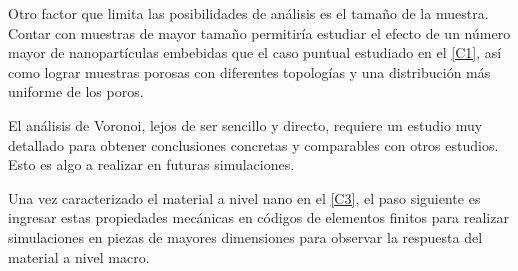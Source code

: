 Otro factor que limita las posibilidades de análisis es el tamaño de la muestra. Contar con muestras de mayor tamaño permitiría estudiar el efecto de un  número mayor de nanopartículas embebidas que el caso puntual estudiado en el \cref{C1}, así como lograr muestras porosas con diferentes topologías y una distribución más uniforme de los poros.

El análisis de Voronoi, lejos de ser sencillo y directo, requiere un estudio muy detallado para obtener conclusiones concretas y comparables con otros estudios. Esto es algo a realizar en futuras simulaciones.

Una vez caracterizado el material a nivel nano en el \cref{C3}, el paso siguiente es ingresar estas propiedades mecánicas en códigos de elementos finitos para realizar simulaciones en piezas de mayores dimensiones para observar la respuesta del material a nivel macro.






